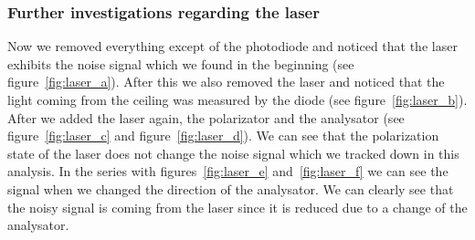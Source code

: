 \subsubsection{Further investigations regarding the laser}
Now we removed everything except of the photodiode and noticed that
the laser exhibits the noise signal which we found in the beginning
(see figure~\ref{fig:laser_a}). After this we also removed the
laser and noticed that the light coming from the ceiling was 
measured by the diode (see figure~\ref{fig:laser_b}).
After we added the laser again, the polarizator and the analysator
(see figure~\ref{fig:laser_c} and figure~\ref{fig:laser_d}).
We can see that the polarization 
state of the laser does not change the noise signal which we 
tracked down in this analysis. In the series with
figures~\ref{fig:laser_e} and~\ref{fig:laser_f} we can see the
signal when we changed the direction of the analysator. 
We can clearly see that the noisy signal is coming from the 
laser since it is reduced due to a change of the analysator.
